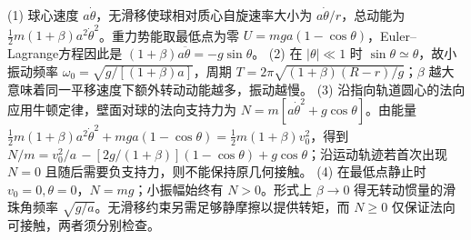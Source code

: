 (1) 球心速度 \(a\dot\theta\)，无滑移使球相对质心自旋速率大小为 \(a\dot\theta/r\)，总动能为 \(\frac12m(1+\beta)a^2\dot\theta^2\)。重力势能取最低点为零 \(U=mga(1-\cos\theta)\)，Euler–Lagrange方程因此是 \((1+\beta)a\ddot\theta=-g\sin\theta\)。
(2) 在 \(|\theta|\ll1\) 时 \(\sin\theta\simeq\theta\)，故小振动频率 \(\omega_0=\sqrt{g/[(1+\beta)a]}\)，周期 \(T=2\pi\sqrt{(1+\beta)(R-r)/g}\)；\(\beta\) 越大意味着同一平移速度下额外转动动能越多，振动越慢。
(3) 沿指向轨道圆心的法向应用牛顿定律，壁面对球的法向支持力为 \(N=m[a\dot\theta^2+g\cos\theta]\)。由能量 \(\frac12m(1+\beta)a^2\dot\theta^2+mga(1-\cos\theta)=\frac12m(1+\beta)v_0^2\)，得到 \(N/m=v_0^2/a\, -[2g/(1+\beta)](1-\cos\theta)+g\cos\theta\)；沿运动轨迹若首次出现 \(N=0\) 且随后需要负支持力，则不能保持原几何接触。
(4) 在最低点静止时 \(v_0=0,\theta=0\)，\(N=mg\)；小振幅始终有 \(N>0\)。形式上 \(\beta\to0\) 得无转动惯量的滑珠角频率 \(\sqrt{g/a}\)。无滑移约束另需足够静摩擦以提供转矩，而 \(N\ge0\) 仅保证法向可接触，两者须分别检查。
